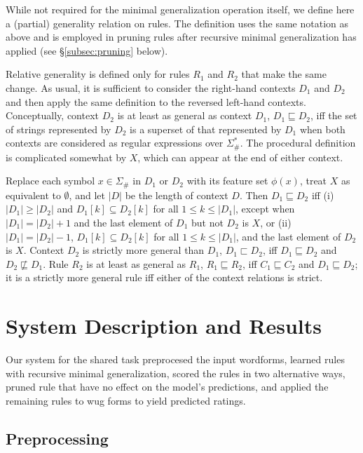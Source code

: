 \documentclass[11pt]{article}
\begin{document}
While not required for the minimal generalization operation itself, we define here a (partial) generality relation on rules. The definition uses the same notation as above and is employed in pruning rules after recursive minimal generalization has applied (see \S\ref{subsec:pruning} below). 

Relative generality is defined only for rules $R_1$ and $R_2$ that make the same change. As usual, it is sufficient to consider the right-hand contexts $D_1$ and $D_2$ and then apply the same definition to the reversed left-hand contexts. Conceptually, context $D_2$ is at least as general as context $D_1$, $D_1 \sqsubseteq D_2$, iff the set of strings represented by $D_2$ is a superset of that represented by $D_1$ when both contexts are considered as regular expressions over $\Sigma_{\#}^*$. The procedural definition is complicated somewhat by $X$, which can appear at the end of either context.

Replace each symbol $x \in \Sigma_{\#}$ in $D_1$ or $D_2$ with its feature set $\phi(x)$, treat $X$ as equivalent to $\emptyset$, and let $|D|$ be the length of context $D$. Then $D_1 \sqsubseteq D_2$ iff (i) $|D_1| \geq |D_2|$ and $D_1[k] \subseteq D_2[k]$ for all $1 \leq k \leq |D_1|$, except when $|D_1| = |D_2| + 1$ and the last element of $D_1$ but not $D_2$ is $X$, or (ii) $|D_1| = |D_2| - 1$, $D_1[k] \subseteq D_2[k]$ for all $1 \leq k \leq |D_1|$, and the last element of $D_2$ is $X$. Context $D_2$ is strictly more general than $D_1$, $D_1 \sqsubset D_2$, iff $D_1 \sqsubseteq D_2$ and $D_2 \not\sqsubseteq D_1$. Rule $R_2$ is at least as general as $R_1$, $R_1 \sqsubseteq R_2$, iff $C_1 \sqsubseteq C_2$ and $D_1 \sqsubseteq D_2$; it is a strictly more general rule iff either of the context relations is strict.


\section{System Description and Results}
\label{sec:system}

Our system for the shared task preprocesed the input wordforms, learned rules with recursive minimal generalization, scored the rules in two alternative ways, pruned rule that have no effect on the model's predictions, and  applied the remaining rules to wug forms to yield predicted ratings.

\subsection{Preprocessing}
\end{document}
